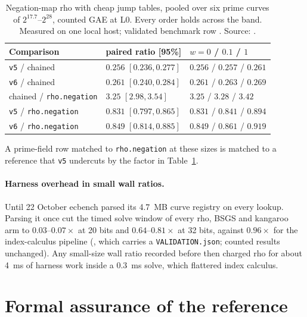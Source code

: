 \begin{table}[t]
\centering\small
\begin{tabular}{@{}lll@{}}
\toprule
Comparison & paired ratio [95\%] & $w=0$ / $0.1$ / $1$ \\
\midrule
\texttt{v5} / chained & $0.256$ $[0.236,0.277]$ & $0.256$ / $0.257$ / $0.261$ \\
\texttt{v6} / chained & $0.261$ $[0.240,0.284]$ & $0.261$ / $0.263$ / $0.269$ \\
chained / \texttt{rho.negation} & $3.25$ $[2.98,3.54]$ & $3.25$ / $3.28$ / $3.42$ \\
\texttt{v5} / \texttt{rho.negation} & $0.831$ $[0.797,0.865]$ & $0.831$ / $0.841$ / $0.894$ \\
\texttt{v6} / \texttt{rho.negation} & $0.849$ $[0.814,0.885]$ & $0.849$ / $0.861$ / $0.919$ \\
\bottomrule
\end{tabular}
\caption[]{Negation-map rho with cheap jump tables, pooled over six prime
curves of $2^{17.7}$--$2^{28}$, counted GAE at L0. Every order holds across
the band. Measured on one local host; validated benchmark row
. Source:
.}
\label{tab:mr-jumps}
\end{table}

A prime-field row matched to \texttt{rho.negation} at these sizes is
matched to a reference that \texttt{v5} undercuts by the factor in
Table~\ref{tab:mr-jumps}.

\paragraph{Harness overhead in small wall ratios.} Until 22 October ecbench
parsed its 4.7~MB curve registry on every lookup. Parsing it once cut the
timed solve window of every rho, BSGS and kangaroo arm to $0.03$--$0.07\times$
at 20 bits and $0.64$--$0.81\times$ at 32 bits, against $0.96\times$ for the
index-calculus pipeline (,
which carries a \texttt{VALIDATION.json}; counted results unchanged). Any
small-size wall ratio recorded before then charged rho for about 4~ms of
harness work inside a 0.3~ms solve, which flattered index calculus.

\section{Formal assurance of the reference}\label{sec:mr-lean}

